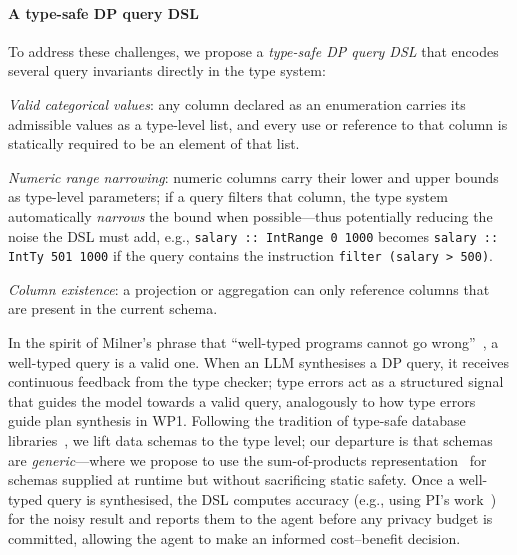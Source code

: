 \documentclass{kaw}
\begin{document}
\paragraph{A type-safe DP query DSL}
%
To address these challenges, we propose a \emph{type-safe DP query DSL} that
encodes several query invariants directly in the type system:
%
\begin{CompactItemizeee}
  \item \emph{Valid categorical values}:
    any column declared as an enumeration carries its admissible values as a
    type-level list, and every use or reference to that column is statically
    required to be an element of that list. 

  \item \emph{Numeric range narrowing}:
    numeric columns carry their lower and upper bounds as type-level
    parameters; if a query filters that column, the type system automatically
    \emph{narrows} the bound when possible---thus potentially
    reducing the noise the DSL must add, e.g.,
    \texttt{salary :: IntRange 0 1000} becomes
    \texttt{salary :: IntTy 501 1000} if the query contains the instruction
    \texttt{filter (salary > 500)}.

  \item \emph{Column existence}:
    a projection or aggregation can only reference columns that are present
    in the current schema.
\end{CompactItemizeee}
%
In the spirit of Milner's phrase that ``well-typed programs cannot go
wrong''~\cite{Milner:TypePoly:78}, a well-typed query is a valid one. 
%
When an LLM synthesises a DP query, it receives continuous feedback from the
type checker; type errors act as a structured signal that guides the model
towards a valid query, analogously to how type errors guide plan synthesis in
WP1.
%
Following the tradition of type-safe database
libraries~\cite{leijen:haskelldb,haskelldb-improved}, we lift data schemas to
the type level; our departure is that schemas are \emph{generic}---where we propose 
to use the
sum-of-products representation~\cite{deVries:SOP:WGP14} for schemas supplied at runtime
but without sacrificing static safety.
%
Once a well-typed query is synthesised, the DSL computes accuracy
(e.g., using PI's  work~\cite{LoboVesga:SP20,LoboVesga:TOPLAS21}) for the noisy
result and reports them to the agent before any privacy budget is committed,
allowing the agent to make an informed cost--benefit decision.
%
\end{document}
